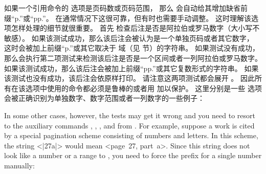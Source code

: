 
如果一个引用命令的  选项是页码数或页码范围，
那么 \biblatex 会自动给其增加缺省前缀“p.”或“pp.”。
在通常情况下这很可靠，但有时也需要手动调整。
这时理解该选项怎样处理的细节就很重要。
首先 \biblatex 检查后注是否是阿拉伯或罗马数字（大小写不敏感）。
如果该测试成功，那么该后注会被认为是一个单独页码或者其它数字，
这时会被加上前缀“p.”或其它取决于  域（见  节）的字符串。
如果测试没有成功，那么会执行第二项测试来检测该后注是否是一个区间或者一列阿拉伯或罗马数字。
如果该测试成功，那么该后注会被加上前缀“pp.”或其它复数形式的字符串。
如果该测试也没有成功，该后注会依原样打印。
请注意这两项测试都会展开 。
因此所有在该选项中使用的命令都必须是鲁棒的或者用  加以保护。
这里分别是一些  选项会被正确识别为单独数字、数字范围或者一列数字的一些例子：

\begin{ltxexample}
\cite[25]{key}
\cite[vii]{key}
\cite[XIV]{key}
\cite[34--38]{key}
\cite[iv--x]{key}
\cite[185/86]{key}
\cite[XI \& XV]{key}
\cite[3, 5, 7]{key}
\cite[vii--x; 5, 7]{key}
\end{ltxexample}
%
In some other cases, however, the tests may get it wrong and you need to resort to the auxiliary commands , , , and  from . For example, suppose a work is cited by a special pagination scheme consisting of numbers and letters. In this scheme, the string <|27a|> would mean <page~27, part~a>. Since this string does not look like a number or a range to \biblatex, you need to force the prefix for a single number manually:


